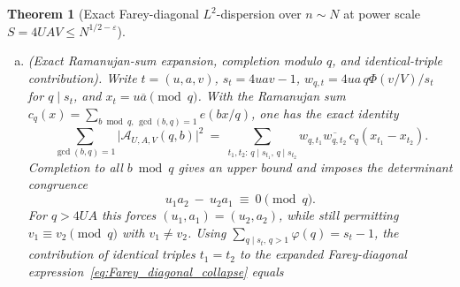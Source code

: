 \documentclass[11pt, a4paper]{article}
\theoremstyle{plain}
\newtheorem{theorem}{Theorem}[section]
\theoremstyle{definition}
\newcommand{\Z}{\mathbb{Z}}
\newcommand{\R}{\mathbb{R}}
\begin{document}
\begin{theorem}[Exact Farey-diagonal $L^{2}$-dispersion over $n\sim N$ at power scale $S=\allowbreak 4UAV\le\allowbreak N^{1/2-\varepsilon}$]
\begin{enumerate}[(a)]
\begin{equation}
    \end{equation}
    where the coefficient $\mathcal{A}_{U,A,V}(q,b)$ is strictly independent of $n$ on $\operatorname{supp}(\Theta)$ and given by
    \begin{equation}\label{eq:Farey_coeff_Aqb}
    \mathcal{A}_{U,A,V}(q,b)\ :=\ \sum_{\substack{u\sim U,\ a\sim A,\ v\ge1\\ 2\nmid u,\ 2\mid a,\ \gcd(u,a)=1\\ 4uav\equiv1\pmod q}}\frac{4ua}{(4uav-1)/q}\,\Phi\!\left(\frac{v}{V}\right)e\!\left(-\frac{4bu^{2}v}{q}\right).
    \end{equation}
    Because any two distinct reduced frequencies $\frac{b_1}{q_1}\neq\frac{b_2}{q_2}$ in $(-1/2,1/2)$ with $q_1,q_2\le S_{\ast}\le 10N^{1/2-\varepsilon}$ satisfy $\big\|\frac{b_1}{q_1}-\frac{b_2}{q_2}\big\|_{\R/\Z}\ge\frac{1}{q_1q_2}\ge S_{\ast}^{-2}\gg N^{-1+2\varepsilon}$, Poisson summation over $n\in\Z$ annihilates \emph{all} off-diagonal pairs $\frac{b_1}{q_1}\neq\frac{b_2}{q_2}$ down to $\mathcal{O}_{B,\varepsilon,\Phi,\Theta}(N^{-B})$ ($\forall\,B>0$), collapsing $\mathcal{V}(N;U,A,V)$ to the exact Farey diagonal:
    \begin{equation}\label{eq:Farey_diagonal_collapse}
    \mathcal{V}(N;U,A,V)\ =\ N\,\widehat{\Theta}(0)\sum_{3\le q\le S_{\ast}}\frac{1}{q^{2}}\sum_{\substack{0<|b|<q/2\\ \gcd(b,q)=1}}\big|\mathcal{A}_{U,A,V}(q,b)\big|^{2}\ +\ \mathcal{O}_{B,\varepsilon,\Phi,\Theta}\!\left(N^{-B}\right).
    \end{equation}
    \item \emph{(Exact Ramanujan-sum expansion, completion modulo $q$, and identical-triple contribution).} Write $t=(u,a,v)$, $s_t=4uav-1$, $w_{q,t}=4ua\,q\Phi(v/V)/s_t$ for $q\mid s_t$, and $x_t=u\overline{a}\pmod q$. With the Ramanujan sum $c_q(x)=\sum_{b\bmod q,\,\gcd(b,q)=1}e(bx/q)$, one has the exact identity
    \[
    \sum_{\gcd(b,q)=1}\big|\mathcal{A}_{U,A,V}(q,b)\big|^{2}\ =\ \sum_{t_1,t_2:\,q\mid s_{t_1},\,q\mid s_{t_2}}w_{q,t_1}\overline{w_{q,t_2}}\,c_q(x_{t_1}-x_{t_2}).
    \]
    Completion to all $b\bmod q$ gives an upper bound and imposes the determinant congruence
    \begin{equation}\label{eq:determinant_congruence_mod_q}
    u_1a_2\ -\ u_2a_1\ \equiv\ 0\pmod q.
    \end{equation}
    For $q>4UA$ this forces $(u_1,a_1)=(u_2,a_2)$, while still permitting $v_1\equiv v_2\pmod q$ with $v_1\ne v_2$. Using $\sum_{q\mid s_t,\,q>1}\varphi(q)=s_t-1$, the contribution of identical triples $t_1=t_2$ to the expanded Farey-diagonal expression~\eqref{eq:Farey_diagonal_collapse} equals

\end{enumerate}
\end{theorem}
\end{document}
